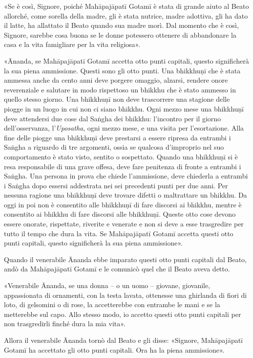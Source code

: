 «Se è così, Signore, poiché Mahāpajāpatī Gotamī è stata di grande aiuto al Beato
allorché, come sorella della madre, gli è stata nutrice, madre adottiva, gli ha
dato il latte, ha allattato il Beato quando sua madre morì. Dal momento che è
così, Signore, sarebbe cosa buona se le donne potessero ottenere di abbandonare
la casa e la vita famigliare per la vita religiosa».

«Ānanda, se Mahāpajāpatī Gotamī accetta otto punti capitali, questo significherà
la sua piena ammissione. Questi sono gli otto punti. Una bhikkhuṇī che è stata
ammessa anche da cento anni deve porgere omaggio, alzarsi, rendere onore
reverenziale e salutare in modo rispettoso un bhikkhu che è stato ammesso in
quello stesso giorno. Una bhikkhuṇī non deve trascorrere una stagione delle
piogge in un luogo in cui non ci siano bhikkhu. Ogni mezzo mese una bhikkhuṇī
deve attendersi due cose dal Saṅgha dei bhikkhu: l’incontro per il giorno
dell’osservanza, l’\emph{Uposatha}, ogni mezzo mese, e una visita per
l’esortazione. Alla fine delle piogge una bhikkhuṇī deve prestarsi a essere
ripresa da entrambi i Saṅgha a riguardo di tre argomenti, ossia se qualcosa
d’improprio nel suo comportamento è stato visto, sentito o sospettato. Quando
una bhikkhuṇī si è resa responsabile di una grave offesa, deve fare penitenza di
fronte a entrambi i Saṅgha. Una persona in prova che chiede l’ammissione, deve
chiederla a entrambi i Saṅgha dopo essersi addestrata nei sei precedenti punti
per due anni. Per nessuna ragione una bhikkhuṇī deve trovare difetti o
maltrattare un bhikkhu. Da oggi in poi non è consentito alle bhikkhuṇī di fare
discorsi ai bhikkhu, mentre è consentito ai bhikkhu di fare discorsi alle
bhikkhuṇī. Queste otto cose devono essere onorate, rispettate, riverite e
venerate e non si deve a esse trasgredire per tutto il tempo che dura la vita.
Se Mahāpajāpatī Gotamī accetta questi otto punti capitali, questo significherà
la sua piena ammissione».

Quando il venerabile Ānanda ebbe imparato questi otto punti capitali dal Beato,
andò da Mahāpajāpatī Gotamī e le comunicò quel che il Beato aveva detto.

«Venerabile Ānanda, se una donna – o un uomo – giovane, giovanile, appassionata
di ornamenti, con la testa lavata, ottenesse una ghirlanda di fiori di loto, di
gelsomini o di rose, la accetterebbe con entrambe le mani e se la metterebbe sul
capo. Allo stesso modo, io accetto questi otto punti capitali per non
trasgredirli finché dura la mia vita».

Allora il venerabile Ānanda tornò dal Beato e gli disse: «Signore, Mahāpajāpatī
Gotamī ha accettato gli otto punti capitali. Ora ha la piena ammissione».

